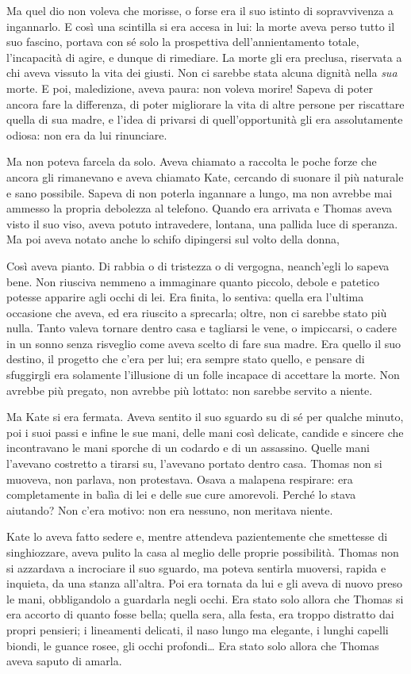 \documentclass[a4paper,oneside,11pt]{memoir}
\begin{document}
Ma quel dio non voleva che morisse, o forse era il suo istinto di sopravvivenza
a ingannarlo. E così una scintilla si era accesa in lui: la morte aveva perso
tutto il suo fascino, portava con sé solo la prospettiva dell'annientamento
totale, l'incapacità di agire, e dunque di rimediare. La morte gli era preclusa,
riservata a chi aveva vissuto la vita dei giusti. Non ci sarebbe stata alcuna
dignità nella \emph{sua} morte. E poi, maledizione, aveva paura: non voleva
morire! Sapeva di poter ancora fare la differenza, di poter migliorare la vita
di altre persone per riscattare quella di sua madre, e l'idea di privarsi di
quell'opportunità gli era assolutamente odiosa: non era da lui rinunciare.

Ma non poteva farcela da solo. Aveva chiamato a raccolta le poche forze che
ancora gli rimanevano e aveva chiamato Kate, cercando di suonare il più naturale
e sano possibile. Sapeva di non poterla ingannare a lungo, ma non avrebbe mai
ammesso la propria debolezza al telefono. Quando era arrivata e Thomas aveva
visto il suo viso, aveva potuto intravedere, lontana, una pallida luce di
speranza. Ma poi aveva notato anche lo schifo dipingersi sul volto della donna,

Così aveva pianto. Di rabbia o di tristezza o di vergogna, neanch'egli lo sapeva
bene. Non riusciva nemmeno a immaginare quanto piccolo, debole e patetico
potesse apparire agli occhi di lei. Era finita, lo sentiva: quella era l'ultima
occasione che aveva, ed era riuscito a sprecarla; oltre, non ci sarebbe stato
più nulla. Tanto valeva tornare dentro casa e tagliarsi le vene, o impiccarsi, o
cadere in un sonno senza risveglio come aveva scelto di fare sua madre. Era
quello il suo destino, il progetto che c'era per lui; era sempre stato quello, e
pensare di sfuggirgli era solamente l'illusione di un folle incapace di
accettare la morte. Non avrebbe più pregato, non avrebbe più lottato: non
sarebbe servito a niente.

Ma Kate si era fermata. Aveva sentito il suo sguardo su di sé per qualche
minuto, poi i suoi passi e infine le sue mani, delle mani così delicate, candide
e sincere che incontravano le mani sporche di un codardo e di un assassino.
Quelle mani l'avevano costretto a tirarsi su, l'avevano portato dentro casa.
Thomas non si muoveva, non parlava, non protestava. Osava a malapena respirare:
era completamente in balìa di lei e delle sue cure amorevoli. Perché lo stava
aiutando? Non c'era motivo: non era nessuno, non meritava niente.

Kate lo aveva fatto sedere e, mentre attendeva pazientemente che smettesse di
singhiozzare, aveva pulito la casa al meglio delle proprie possibilità. Thomas
non si azzardava a incrociare il suo sguardo, ma poteva sentirla muoversi,
rapida e inquieta, da una stanza all'altra. Poi era tornata da lui e gli aveva
di nuovo preso le mani, obbligandolo a guardarla negli occhi. Era stato solo
allora che Thomas si era accorto di quanto fosse bella; quella sera, alla festa,
era troppo distratto dai propri pensieri; i lineamenti delicati, il naso lungo
ma elegante, i lunghi capelli biondi, le guance rosee, gli occhi profondi\dots
Era stato solo allora che Thomas aveva saputo di amarla.
\end{document}
